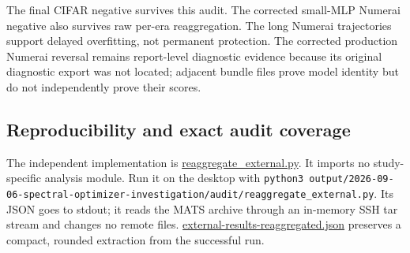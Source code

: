 \documentclass[
  british,
  10pt,
  a4paper,
]{article}
\begin{document}
The final CIFAR negative survives this audit. The corrected small-MLP
Numerai negative also survives raw per-era
reaggregatio\allowbreak{}n.\allowbreak{} The long Numerai trajectories
support delayed overfitting,\allowbreak{} not permanent
protection.\allowbreak{} The corrected production Numerai reversal
remains report-\allowbreak{}level diagnostic evidence because its
original diagnostic export was not located; adjacent bundle files prove
model identity but do not independently prove their scores.

\subsection{Reproducibility and exact audit
coverage}\label{external-results-audit--reproducibility-and-exact-audit-coverage}

The independent implementation is
\href{../audit/reaggregate_external.py}{reaggregate\_\allowbreak{}external.\allowbreak{}py}.
It imports no study-\allowbreak{}specific analysis module. Run it on the
desktop with
\texttt{python3 \allowbreak{}output/\allowbreak{}2026-\allowbreak{}09-\allowbreak{}06-\allowbreak{}spectral-\allowbreak{}optimizer-\allowbreak{}investigatio\allowbreak{}n/\allowbreak{}audit/\allowbreak{}reaggregate\_\allowbreak{}external.\allowbreak{}py}.
Its JSON goes to stdout; it reads the MATS archive through an in-memory
SSH tar stream and changes no remote files.
\href{../audit/external-results-reaggregated.json}{external-\allowbreak{}results-\allowbreak{}reaggregated\allowbreak{}.\allowbreak{}json}
preserves a compact, rounded extraction from the successful run.
\end{document}
